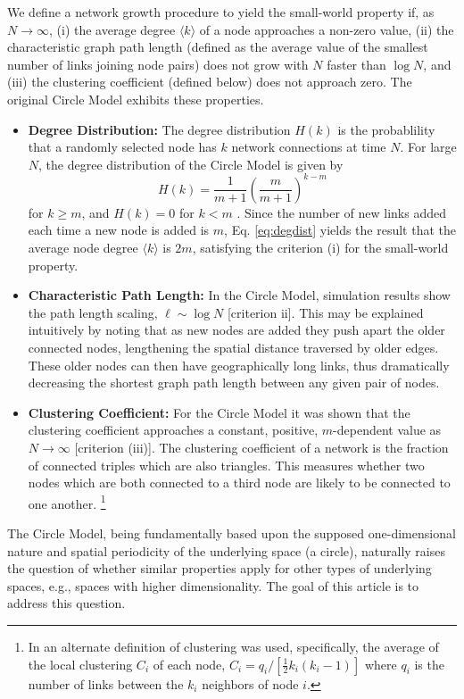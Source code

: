 \documentclass[aps,pre,reprint,superscriptaddress,amsmath,amssymb,nofootinbib]{revtex4-1}
\begin{document}
We define a network growth procedure to yield the small-world property if, as $N \to \infty$,
(i) the average degree $\langle k \rangle$ of a node approaches a non-zero value,
(ii) the characteristic graph path length (defined as the average value of the smallest number of links joining node pairs) does not grow with $N$ faster than $\log N$, and
(iii) the clustering coefficient (defined below) does not approach zero.
The original Circle Model exhibits these properties.
\begin{itemize}
  \item \textbf{Degree Distribution:} The degree distribution $H(k)$ is the probablility that a randomly selected node has $k$ network connections at time $N$.
For large $N$, the degree distribution of the Circle Model is given by 
\begin{equation}\label{eq:degdist}
H(k) = \frac{1}{m+1}\left(\frac{m}{m+1}\right)^{k-m}
\end{equation}
for $k \geq m$, and $H(k) = 0$ for $k < m$ \cite{ozik2004}.
Since the number of new links added each time a new node is added is $m$, Eq. \eqref{eq:degdist} yields the result that the average node degree $\langle k \rangle$ is $2m$, satisfying the criterion (i) for the small-world property.
  \item \textbf{Characteristic Path Length:} In the Circle Model, simulation results show the path length scaling, $\ell \sim \log N$ [criterion ii].
This may be explained intuitively by noting that as new nodes are added they push apart the older connected nodes, lengthening the spatial distance traversed by older edges. 
These older nodes can then have geographically long links, thus dramatically decreasing the shortest graph path length between any given pair of nodes.
  \item \textbf{Clustering Coefficient:} For the Circle Model it was shown  that the clustering coefficient approaches a constant, positive, $m$-dependent value as $N \to \infty$ [criterion (iii)]. 
The clustering coefficient of a network is the fraction of connected triples which are also triangles.
This measures whether two nodes which are both connected to a third node are likely to be connected to one another. \footnote{In \cite{ozik2004} an alternate definition of clustering was used, specifically, the average of the local clustering $C_i$ of each node, $C_i = q_i/[\frac{1}{2} k_i (k_i-1)]$ where $q_i$ is the number of links between the $k_i$ neighbors of node $i$.}
\end{itemize}
The Circle Model, being fundamentally based upon the supposed one-dimensional nature and spatial periodicity of the underlying space (a circle), naturally raises the question of whether similar properties apply for other types of underlying spaces, e.g., spaces with higher dimensionality. 
The goal of this article is to address this question.
\end{document}
